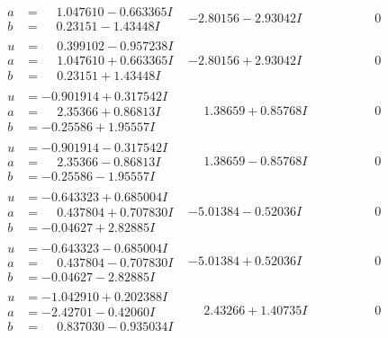 \documentclass[1p]{elsarticle_modified}
\theoremstyle{definition}
\begin{document}
$$\begin{array}{c|c|c}
\begin{aligned}
a &= \phantom{-}1.047610 - 0.663365 I \\
b &= \phantom{-}0.23151 - 1.43448 I\end{aligned}
 & -2.80156 - 2.93042 I & \phantom{-0.000000 } 0 \\ \hline\begin{aligned}
u &= \phantom{-}0.399102 - 0.957238 I \\
a &= \phantom{-}1.047610 + 0.663365 I \\
b &= \phantom{-}0.23151 + 1.43448 I\end{aligned}
 & -2.80156 + 2.93042 I & \phantom{-0.000000 } 0 \\ \hline\begin{aligned}
u &= -0.901914 + 0.317542 I \\
a &= \phantom{-}2.35366 + 0.86813 I \\
b &= -0.25586 + 1.95557 I\end{aligned}
 & \phantom{-}1.38659 + 0.85768 I & \phantom{-0.000000 } 0 \\ \hline\begin{aligned}
u &= -0.901914 - 0.317542 I \\
a &= \phantom{-}2.35366 - 0.86813 I \\
b &= -0.25586 - 1.95557 I\end{aligned}
 & \phantom{-}1.38659 - 0.85768 I & \phantom{-0.000000 } 0 \\ \hline\begin{aligned}
u &= -0.643323 + 0.685004 I \\
a &= \phantom{-}0.437804 + 0.707830 I \\
b &= -0.04627 + 2.82885 I\end{aligned}
 & -5.01384 - 0.52036 I & \phantom{-0.000000 } 0 \\ \hline\begin{aligned}
u &= -0.643323 - 0.685004 I \\
a &= \phantom{-}0.437804 - 0.707830 I \\
b &= -0.04627 - 2.82885 I\end{aligned}
 & -5.01384 + 0.52036 I & \phantom{-0.000000 } 0 \\ \hline\begin{aligned}
u &= -1.042910 + 0.202388 I \\
a &= -2.42701 - 0.42060 I \\
b &= \phantom{-}0.837030 - 0.935034 I\end{aligned}
 & \phantom{-}2.43266 + 1.40735 I & \phantom{-0.000000 } 0 \\ \hline\begin{aligned}

\end{aligned}
\end{array}$$
\end{document}
